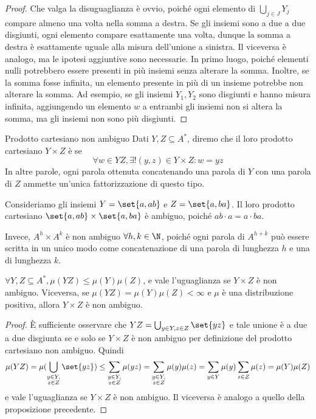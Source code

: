 \begin{proof}
  Che valga la disuguaglianza è ovvio, poiché ogni elemento di \(\bigcup_{j \in J}Y_j\) compare almeno una volta nella somma a destra.
  Se gli insiemi sono a due a due disgiunti, ogni elemento compare esattamente una volta, dunque la somma a destra è esattamente uguale alla misura dell'unione a sinistra.
  Il viceversa è analogo, ma le ipotesi aggiuntive sono necessarie.
  In primo luogo, poiché elementi nulli potrebbero essere presenti in più insiemi senza alterare la somma.
  Inoltre, se la somma fosse infinita, un elemento presente in più di un insieme potrebbe non alterare la somma.
  Ad esempio, se gli insiemi \(Y_1,Y_2\) sono disgiunti e hanno misura infinita, aggiungendo un elemento \(w\) a entrambi gli insiemi non si altera la somma, ma gli insiemi non sono più disgiunti.
\end{proof}

\begin{definition}{Prodotto cartesiano non ambiguo}
  Dati \(Y,Z \subseteq A^*\), diremo che il loro prodotto cartesiano \(Y\times Z\) è  se
    \[\forall w \in YZ, \exists! (y,z) \in Y \times Z : w = yz\]
  In altre parole, ogni parola ottenuta concatenando una parola di \(Y\) con una parola di \(Z\) ammette un'unica fattorizzazione di questo tipo.
\end{definition}

\begin{example}[label=ex:non_ambiguos_prod]{}
  Consideriamo gli insiemi \(Y = \set{a,ab}\) e \(Z = \set{a,ba}\).
  Il loro prodotto cartesiano \(\set{a,ab}\times\set{a,ba}\) è ambiguo, poiché \(ab\cdot a = a\cdot ba\).

  Invece, \(A^h\times A^k\) è non ambiguo \(\forall h,k \in \N\), poiché ogni parola di \(A^{h+k}\) può essere scritta in un unico modo come concatenazione di una parola di lunghezza \(h\) e una di lunghezza \(k\).
\end{example}
\begin{proposition}[label=prop:distribution_distributivity_over_product]{}
  \(\forall Y,Z \subseteq A^*, \mu(YZ) \leq \mu(Y)\mu(Z)\), e vale l'uguaglianza se \(Y\times Z\) è non ambiguo.
  Viceversa, se \(\mu(YZ) = \mu(Y)\mu(Z) < \infty\) e \(\mu\) è una distribuzione positiva, allora \(Y\times Z\) è non ambiguo.
\end{proposition}
\begin{proof}
  È sufficiente osservare che \(YZ = \bigcup_{y\in Y, z \in Z}\set{yz}\) e tale unione è a due a due disgiunta se e solo se \(Y\times Z\) è non ambiguo per definizione del prodotto cartesiano non ambiguo.
  Quindi
  \[\mu(YZ) = \mu(\bigcup_{\substack{y\in Y,\\ z \in Z}}\set{yz}) \leq \sum_{\substack{y\in Y,\\ z \in Z}}\mu(yz) = \sum_{\substack{y\in Y,\\ z \in Z}}\mu(y)\mu(z) =\sum_{y \in Y}\mu(y) \sum_{z \in Z}\mu(z) = \mu(Y)\mu(Z)\]
  e vale l'uguaglianza se \(Y\times Z\) è non ambiguo.
  Il viceversa è analogo a quello della proposizione precedente.
\end{proof}

